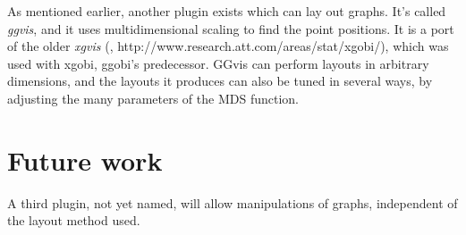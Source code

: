 \documentclass[11pt]{article}
\begin{document}
As mentioned earlier, another plugin exists which can lay out
graphs.  It's called {\em ggvis}, and it uses multidimensional
scaling to find the point positions.  It is a port of the older
{\em xgvis} (\cite{xgvis_jcgs2002}, http://www.research.att.com/areas/stat/xgobi/), which
was used with xgobi, ggobi's predecessor.  GGvis can perform layouts in
arbitrary dimensions, and the layouts it produces can also be tuned in
several ways, by adjusting the many parameters of the MDS function.

\section{Future work}

A third plugin, not yet named, will allow manipulations of
graphs, independent of the layout method used.


\end{document}
